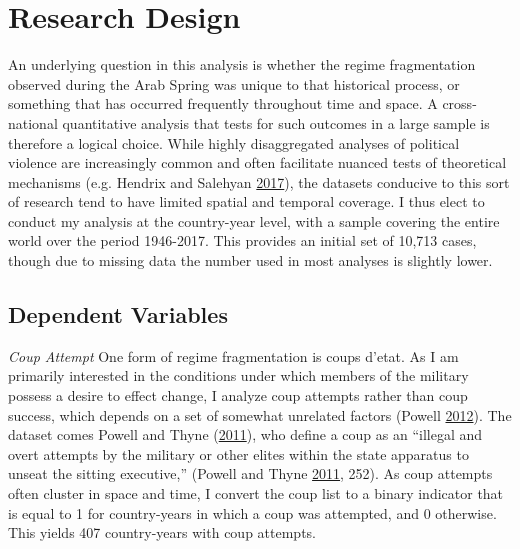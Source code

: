\documentclass[12pt,]{article}
\theoremstyle{definition}
\theoremstyle{definition}
\theoremstyle{definition}
\theoremstyle{remark}
\begin{document}
\hypertarget{research-design}{%
\section{Research Design}\label{research-design}}

An underlying question in this analysis is whether the regime
fragmentation observed during the Arab Spring was unique to that
historical process, or something that has occurred frequently throughout
time and space. A cross-national quantitative analysis that tests for
such outcomes in a large sample is therefore a logical choice. While
highly disaggregated analyses of political violence are increasingly
common and often facilitate nuanced tests of theoretical mechanisms
(e.g. Hendrix and Salehyan \protect\hyperlink{ref-Hendrix2017}{2017}),
the datasets conducive to this sort of research tend to have limited
spatial and temporal coverage. I thus elect to conduct my analysis at
the country-year level, with a sample covering the entire world over the
period 1946-2017. This provides an initial set of 10,713 cases, though
due to missing data the number used in most analyses is slightly lower.

\hypertarget{dependent-variables}{%
\subsection{Dependent Variables}\label{dependent-variables}}

\emph{Coup Attempt} One form of regime fragmentation is coups d'etat. As
I am primarily interested in the conditions under which members of the
military possess a desire to effect change, I analyze coup attempts
rather than coup success, which depends on a set of somewhat unrelated
factors (Powell \protect\hyperlink{ref-Powell2012a}{2012}). The dataset
comes Powell and Thyne (\protect\hyperlink{ref-Powell2011}{2011}), who
define a coup as an ``illegal and overt attempts by the military or
other elites within the state apparatus to unseat the sitting
executive,'' (Powell and Thyne \protect\hyperlink{ref-Powell2011}{2011},
252). As coup attempts often cluster in space and time, I convert the
coup list to a binary indicator that is equal to 1 for country-years in
which a coup was attempted, and 0 otherwise. This yields 407
country-years with coup attempts.
\end{document}
